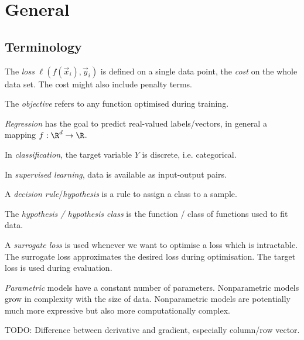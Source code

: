 \chapter{General}

\section{Terminology}
The \emph{loss} $\ell(f(\vec{x}_i), \vec{y}_i)$ is defined
on a single data point,
the \emph{cost} on the whole data set.
The cost might also include penalty terms.

The \emph{objective} refers to any function
optimised during training.

\emph{Regression} has the goal to predict real-valued
labels/vectors, in general a mapping
$f : \R^d \to \R$.

In \emph{classification}, the target variable
$Y$ is discrete, i.e. categorical.

In \emph{supervised learning}, data is available
as input-output pairs.

A \emph{decision rule}/\emph{hypothesis} is a rule
to assign a class to a sample.

The \emph{hypothesis / hypothesis class} is the
function / class of functions used to fit data.

A \emph{surrogate loss} is used whenever we want
to optimise a loss which is intractable.
The surrogate loss approximates the desired
loss during optimisation.
The target loss is used during evaluation.

\emph{Parametric} models have a constant number of parameters.
Nonparametric models grow in complexity
with the size of data.
Nonparametric models are potentially much more expressive
but also more computationally complex.


TODO: Difference between derivative and gradient,
especially column/row vector.













